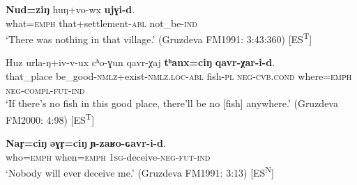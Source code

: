 \documentclass[output=paper,colorlinks,citecolor=brown]{langscibook}
\begin{document}
\ea\label{ex:niv:119}
    \gll \textbf{Nud=ziŋ} huŋ+vo-wx \textbf{ujɣi-d}. \\ 
         what=\textsc{emph} that+settlement-\textsc{abl} not\_be-\textsc{ind} \\
    \glt ‘There was nothing in that village.’ (Gruzdeva FM1991: 3:43:360) [ES\textsuperscript{T}]
\z 

\ea\label{ex:niv:120}
    \gll Huz urla-ŋ+iv-v-ux cʰo-ɣun qavr-χaj \textbf{tʰanx=ciŋ} \textbf{qavr-χar-i-d}. \\ 
         that\_place be\_good-\textsc{nmlz}+exist-\textsc{nmlz.loc-abl} fish-\textsc{pl} \textsc{neg-cvb.cond} where=\textsc{emph} \textsc{neg-compl-fut-ind} \\
    \glt ‘If there’s no fish in this good place, there’ll be no [fish] anywhere.’ (Gruzdeva FM2000: 4:98) [ES\textsuperscript{T}]
\z 


\ea\label{ex:niv:122}
    \gll \textbf{Nar̥=ciŋ} \textbf{əɣr̥=ciŋ} \textbf{ɲ-zaʁo-ɢavr-i-d}. \\ 
         who=\textsc{emph} when=\textsc{emph} \textsc{1sg-}deceive-\textsc{neg-fut-ind} \\
    \glt ‘Nobody will ever deceive me.’ (Gruzdeva FM1991: 3:13) [ES\textsuperscript{N}]
\z 
\end{document}

